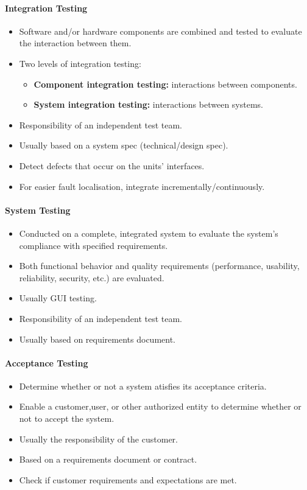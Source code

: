 \documentclass[../ESOF_notes.tex]{subfiles}
\begin{document}
\paragraph{Integration Testing}
\begin{itemize}
    \item Software and/or hardware components are
          combined and tested to evaluate the interaction
          between them.
    \item Two levels of integration testing:
          \begin{itemize}
              \item \textbf{Component integration testing:}
                    interactions between components.
              \item \textbf{System integration testing:}
                    interactions between systems.
          \end{itemize}
    \item Responsibility of an independent test team.
    \item Usually based on a system spec (technical/design spec).
    \item Detect defects that occur on the units’ interfaces.
    \item For easier fault localisation, integrate
          incrementally/continuously.
\end{itemize}
\paragraph{System Testing}
\begin{itemize}
    \item Conducted on a complete, integrated system
          to evaluate the system's compliance with specified 
          requirements.                
    \item Both functional behavior and quality requirements
          (performance, usability, reliability, security, etc.) 
          are evaluated.   
    \item Usually GUI testing.
    \item Responsibility of an independent test team.
    \item Usually based on requirements document.
\end{itemize}
\paragraph{Acceptance Testing}
\begin{itemize}
    \item Determine whether or not a system atisfies its
          acceptance criteria.
    \item Enable a customer,user, or other authorized entity
          to determine whether or not to accept the system.
    \item Usually the responsibility of the customer.
    \item Based on a requirements document or contract.
    \item Check if customer requirements and expectations
          are met.
\end{itemize}
\end{document}
